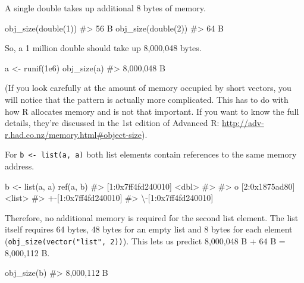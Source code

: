 \documentclass[
]{krantz}
\makeatletter
\newenvironment{Shaded}{\begin{snugshade}}{\end{snugshade}}
\newcommand{\CommentTok}[1]{\textcolor[rgb]{0.56,0.35,0.01}{\textit{#1}}}
\newcommand{\DecValTok}[1]{\textcolor[rgb]{0.00,0.00,0.81}{#1}}
\newcommand{\FloatTok}[1]{\textcolor[rgb]{0.00,0.00,0.81}{#1}}
\newcommand{\KeywordTok}[1]{\textcolor[rgb]{0.13,0.29,0.53}{\textbf{#1}}}
\newcommand{\NormalTok}[1]{#1}
\newcommand{\StringTok}[1]{\textcolor[rgb]{0.31,0.60,0.02}{#1}}
\newenvironment{kframe}{%
\medskip{}
\setlength{\fboxsep}{.8em}
 \def\at@end@of@kframe{}%
 \ifinner\ifhmode%
  \def\at@end@of@kframe{\end{minipage}}%
  \begin{minipage}{\columnwidth}%
 \fi\fi%
 \def\FrameCommand##1{\hskip\@totalleftmargin \hskip-\fboxsep
 \colorbox{shadecolor}{##1}\hskip-\fboxsep
     \hskip-\linewidth \hskip-\@totalleftmargin \hskip\columnwidth}%
 \MakeFramed {\advance\hsize-\width
   \@totalleftmargin\z@ \linewidth\hsize
   \@setminipage}}%
 {\par\unskip\endMakeFramed%
 \at@end@of@kframe}
\renewenvironment{Shaded}{\begin{kframe}}{\end{kframe}}
\renewcommand{\KeywordTok} [1]{\textcolor[rgb]{0.00,0.44,0.13}{{#1}}}
\renewcommand{\DecValTok}  [1]{\textcolor[rgb]{0.25,0.63,0.44}{{#1}}}
\renewcommand{\FloatTok}   [1]{\textcolor[rgb]{0.25,0.63,0.44}{{#1}}}
\renewcommand{\StringTok}  [1]{\textcolor[rgb]{0.25,0.44,0.63}{{#1}}}
\renewcommand{\CommentTok} [1]{\textcolor[rgb]{0.38,0.63,0.69}{{#1}}}
\renewcommand{\NormalTok}  [1]{{#1}}
\makeatother
\begin{document}
A single double takes up additional 8 bytes of memory.

\begin{Shaded}
\begin{Highlighting}[]
\KeywordTok{obj_size}\NormalTok{(}\KeywordTok{double}\NormalTok{(}\DecValTok{1}\NormalTok{))}
\CommentTok{#> 56 B}
\KeywordTok{obj_size}\NormalTok{(}\KeywordTok{double}\NormalTok{(}\DecValTok{2}\NormalTok{))}
\CommentTok{#> 64 B}
\end{Highlighting}
\end{Shaded}

So, a 1 million double should take up 8,000,048 bytes.

\begin{Shaded}
\begin{Highlighting}[]
\NormalTok{a <-}\StringTok{ }\KeywordTok{runif}\NormalTok{(}\FloatTok{1e6}\NormalTok{)}
\KeywordTok{obj_size}\NormalTok{(a)}
\CommentTok{#> 8,000,048 B}
\end{Highlighting}
\end{Shaded}

(If you look carefully at the amount of memory occupied by short vectors, you will notice that the pattern is actually more complicated. This has to do with how R allocates memory and is not that important. If you want to know the full details, they're discussed in the 1st edition of Advanced R: \url{http://adv-r.had.co.nz/memory.html\#object-size}).

For \texttt{b\ \textless{}-\ list(a,\ a)} both list elements contain references to the same memory address.

\begin{Shaded}
\begin{Highlighting}[]
\NormalTok{b <-}\StringTok{ }\KeywordTok{list}\NormalTok{(a, a)}
\KeywordTok{ref}\NormalTok{(a, b)}
\CommentTok{#> [1:0x7ff4fd240010] <dbl> }
\CommentTok{#>  }
\CommentTok{#> o [2:0x1875ad80] <list> }
\CommentTok{#> +-[1:0x7ff4fd240010] }
\CommentTok{#> \textbackslash{}-[1:0x7ff4fd240010]}
\end{Highlighting}
\end{Shaded}

Therefore, no additional memory is required for the second list element. The list itself requires 64 bytes, 48 bytes for an empty list and 8 bytes for each element (\texttt{obj\_size(vector("list",\ 2))}). This lets us predict 8,000,048 B + 64 B = 8,000,112 B.

\begin{Shaded}
\begin{Highlighting}[]
\KeywordTok{obj_size}\NormalTok{(b)}
\CommentTok{#> 8,000,112 B}
\end{Highlighting}
\end{Shaded}
\end{document}
